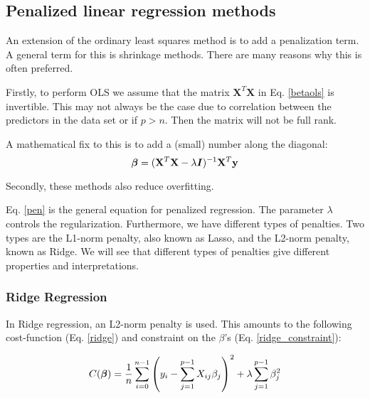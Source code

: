 
\subsection{Penalized linear regression methods}

An extension of the ordinary least squares method is to add a penalization term. A general term for this is shrinkage methods. There are many reasons why this is often preferred. 

Firstly, to perform OLS we assume that the matrix $\boldsymbol{X}^T\boldsymbol{X}$ in Eq. \ref{betaols} is invertible. This may not always be the case due to correlation between the predictors in the data set or if $p > n$. Then the matrix will not be full rank. 

A mathematical fix to this is to add a (small) number along the diagonal: 
\begin{equation}\label{pen}
    \boldsymbol{\beta} = (\mathbf{X}^T\mathbf{X}- \lambda\boldsymbol{I})^{-1}\mathbf{X}^T\mathbf{y}
\end{equation}

Secondly, these methods also reduce overfitting. 

Eq. \ref{pen} is the general equation for penalized regression. The parameter $\lambda$ controls the regularization. Furthermore, we have different types of penalties. Two types are the L1-norm penalty, also known as Lasso, and the L2-norm penalty, known as Ridge. We will see that different types of penalties give different properties and interpretations.

\subsubsection{Ridge Regression}\label{ridge_sec}

In Ridge regression, an L2-norm penalty is used. This amounts to the following cost-function (Eq. \ref{ridge}) and constraint on the $\beta$'s (Eq. \ref{ridge_constraint}):

\begin{equation}\label{ridge}
     C(\boldsymbol{\beta}) = \frac{1}{n} \sum_{i=0}^{n-1} \left( y_i - \sum_{j=1}^{p-1} X_{ij}\beta_j \right)^2 + \lambda\sum_{j=1}^{p-1} \beta_j^2 
\end{equation}



